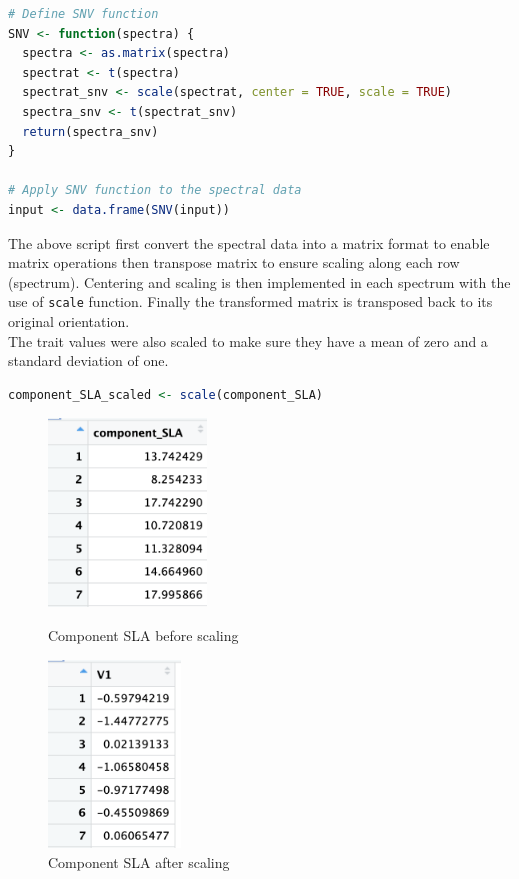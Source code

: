 \documentclass[12pt,a4paper]{report}
\begin{document}
\begin{lstlisting}[language=R, style=mystyle]
# Define SNV function
SNV <- function(spectra) {
  spectra <- as.matrix(spectra)
  spectrat <- t(spectra)
  spectrat_snv <- scale(spectrat, center = TRUE, scale = TRUE)
  spectra_snv <- t(spectrat_snv)
  return(spectra_snv)
}

# Apply SNV function to the spectral data
input <- data.frame(SNV(input))
\end{lstlisting}

The above script first convert the spectral data into a matrix format to enable matrix operations then transpose matrix to ensure scaling along each row (spectrum). Centering and scaling is then implemented in each spectrum with the use of \texttt{scale} function. Finally the transformed matrix is transposed back to its original orientation. \\

The trait values were also scaled to make sure they have a mean of zero and a standard deviation of one. \\

\begin{lstlisting}[language=R, style=mystyle]
component_SLA_scaled <- scale(component_SLA)
\end{lstlisting}

\begin{figure}[h]
    \centering
    \begin{minipage}{0.45\textwidth}
        \centering
        \includegraphics[height=5cm]{Figures/snv1.png} 
        \caption{Component SLA before scaling}
        \label{fig:snv1}
    \end{minipage}
    \hfill
    \begin{minipage}{0.45\textwidth}
        \centering
        \includegraphics[height=5cm]{Figures/snv2.png} 
        \caption{Component SLA after scaling}
        \label{fig:snv2}
    \end{minipage}
\end{figure}
\end{document}
